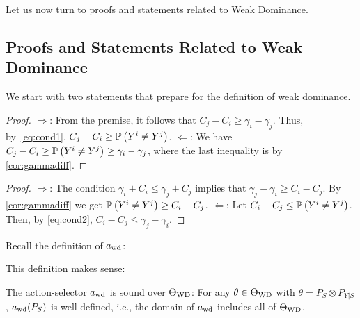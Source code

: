Let us now turn to proofs and statements related to Weak Dominance.
\subsection{Proofs and Statements Related to Weak Dominance}
We start with two statements that prepare for the definition of weak dominance.
\propIlej*
\begin{proof}
	\noindent $\Rightarrow$: From the premise, it follows that $C_j - C_i \ge \gamma_i - \gamma_j$.
	Thus, by~\eqref{eq:cond1}, $C_j - C_i \ge \mathbb{P}\left(Y^i\ne Y^j\right)$.
	\noindent $\Leftarrow$: We have $C_j - C_i \ge \mathbb{P}\left(Y^i \ne Y^j\right) \ge \gamma_i -\gamma_j$, where the last
	inequality is by \cref{cor:gammadiff}.
	\end{proof}
	
\propJlei*
	\begin{proof}
		\noindent $\Rightarrow$: The condition $\gamma_i + C_i \le \gamma_j + C_j$ implies that $\gamma_j -\gamma_i \ge C_i - C_j$.
		By \cref{cor:gammadiff} we get $\mathbb{P}\left(Y^i \ne Y^j\right) \ge C_i - C_j$.
		\noindent $\Leftarrow$: Let $C_i - C_j \le \mathbb{P}\left(Y^i \ne Y^j\right)$. Then, by \eqref{eq:cond2}, $C_i - C_j \le \gamma_j - \gamma_i$.
	\end{proof}

Recall the definition of $a_{\mathrm{wd}}$:

This definition makes sense:
\begin{prop}
	\label{prop:awdwelldef}
	The action-selector $a_{\mathrm{wd}}$ is sound over $\Theta_{\mathrm{WD}}$:
	For any $\theta \in \Theta_{\mathrm{WD}}$ with $\theta = P_S\otimes P_{Y|S}$, $a_{\mathrm{wd}}(P_S)$ is well-defined, i.e., the domain
	of $a_{\mathrm{wd}}$ includes all of $\Theta_{\mathrm{WD}}$.
\end{prop}

